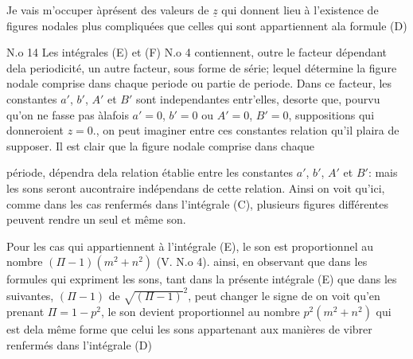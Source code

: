 \documentclass[11pt,a4paper]{article}
\begin{document}
Je vais m'occuper àprésent des valeurs de $\underline{z}$ qui donnent lieu à
l'existence de figures nodales plus compliquées que celles qui sont
 appartiennent ala formule (D)

N.o 14 Les intégrales (E) et (F) N.o 4 contiennent, outre le facteur
dépendant dela periodicité, un autre facteur, sous forme de
série;  lequel détermine la figure nodale comprise dans
chaque periode ou partie de periode. Dans ce facteur,
les constantes $a'$, $b'$, $A'$ et $B'$ sont independantes entr'elles,
desorte que, pourvu qu'on ne fasse pas àlafois $a'=0$, $b'=0$ ou
$A'=0$, $B'=0$, suppositions qui donneroient $z=0$., on peut imaginer
entre ces constantes  relation qu'il plaira de supposer.
Il est clair que la figure nodale comprise dans chaque


période, dépendra dela relation établie entre les constantes
$a'$, $b'$, $A'$ et $B'$: mais les sons seront aucontraire indépendans
de cette relation. Ainsi on voit qu'ici, comme dans les cas
renfermés dans l'intégrale (C), plusieurs figures différentes
peuvent rendre un seul et même son.

Pour les cas qui appartiennent à l'intégrale (E), le
son est proportionnel au nombre $(\Pi-1)(m^2+n^2)$ (V. N.o 4).
ainsi, en  observant que
dans les formules qui expriment les sons, tant dans la présente
intégrale (E) que dans les suivantes, $(\Pi-1)$   de
$\sqrt{(\Pi-1)}^2$,    peut changer le signe de   on voit
qu'en prenant $\Pi=1-p^2$, le son devient proportionnel
au nombre $p^2(m^2+n^2)$  qui  est dela même
forme que celui   les sons  appartenant
aux manières de vibrer renfermés dans l'intégrale
(D)
\end{document}
